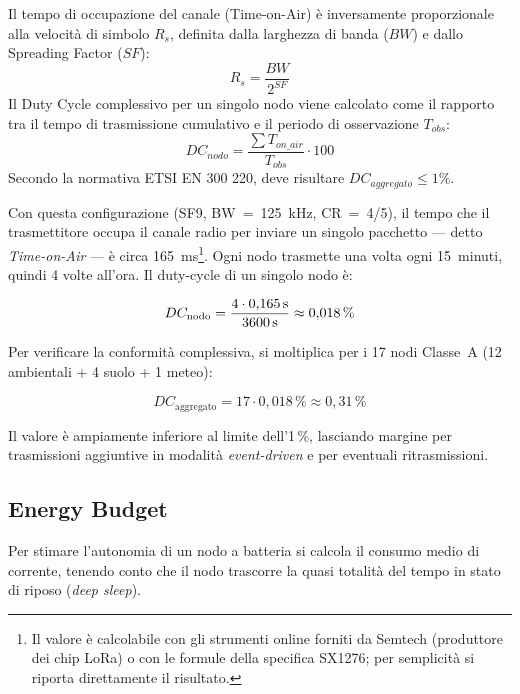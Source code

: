\noindent Il tempo di occupazione del canale (Time-on-Air) è inversamente proporzionale alla velocità di simbolo $R_s$, definita dalla larghezza di banda ($BW$) e dallo Spreading Factor ($SF$):
\begin{equation}
	R_s = \frac{BW}{2^{SF}}
\end{equation}
Il Duty Cycle complessivo per un singolo nodo viene calcolato come il rapporto tra il tempo di trasmissione cumulativo e il periodo di osservazione $T_{obs}$:
\begin{equation}
	DC_{nodo} = \frac{\sum T_{on\_air}}{T_{obs}} \cdot 100
\end{equation}
Secondo la normativa ETSI EN 300 220, deve risultare $DC_{aggregato} \leq 1\%$.\newline


\noindent Con questa configurazione (SF9, BW~=~125~kHz, CR~=~4/5), il tempo che il trasmettitore occupa il canale radio per inviare un singolo pacchetto --- detto \textit{Time-on-Air} --- è circa 165~ms\footnote{Il valore è calcolabile con gli strumenti online forniti da Semtech (produttore dei chip LoRa) o con le formule della specifica SX1276; per semplicità si riporta direttamente il risultato.}. Ogni nodo trasmette una volta ogni 15~minuti, quindi 4 volte all'ora. Il duty-cycle di un singolo nodo è:

\[
    DC_{\text{nodo}} = \frac{4 \cdot 0{,}165 \text{\,s}}{3600 \text{\,s}} \approx 0{,}018\,\%
\]

\noindent Per verificare la conformità complessiva, si moltiplica per i 17 nodi Classe~A (12 ambientali + 4 suolo + 1 meteo):

\[
    DC_{\text{aggregato}} = 17 \cdot 0{,}018\,\% \approx 0{,}31\,\%
\]

\noindent Il valore è ampiamente inferiore al limite dell'1\,\%, lasciando margine per trasmissioni aggiuntive in modalità \textit{event-driven} e per eventuali ritrasmissioni.

\subsection{Energy Budget}

Per stimare l'autonomia di un nodo a batteria si calcola il consumo medio di corrente, tenendo conto che il nodo trascorre la quasi totalità del tempo in stato di riposo (\textit{deep sleep}). 

